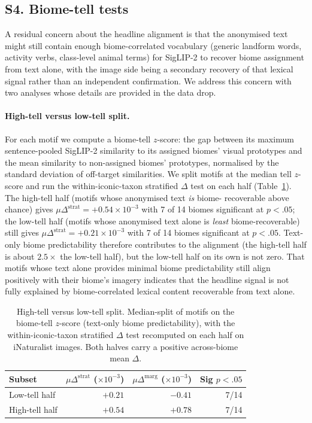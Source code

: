 \documentclass[11pt,a4paper]{article}
\begin{document}
\subsection*{S4. Biome-tell tests}\label{sec:biome-tell}

A residual concern about the headline alignment is that the
anonymised text might still contain enough biome-correlated
vocabulary (generic landform words, activity verbs,
class-level animal terms) for SigLIP-2 to recover biome
assignment from text alone, with the image side being a
secondary recovery of that lexical signal rather than an
independent confirmation. We address this concern with two
analyses whose details are provided in the data drop.

\paragraph*{High-tell versus low-tell split.} For each motif we
compute a biome-tell $z$-score: the gap between its maximum
sentence-pooled SigLIP-2 similarity to its assigned biomes'
visual prototypes and the mean similarity to non-assigned
biomes' prototypes, normalised by the standard deviation of
off-target similarities. We split motifs at the median tell
$z$-score and run the within-iconic-taxon stratified $\Delta$
test on each half (Table~\ref{tab:biome-tell-split}). The
high-tell half (motifs whose anonymised text \emph{is} biome-
recoverable above chance) gives $\mu\Delta^{\text{strat}} =
+0.54\times 10^{-3}$ with 7 of 14 biomes significant at $p<.05$;
the low-tell half (motifs whose anonymised text alone is
\emph{least} biome-recoverable) still gives $\mu\Delta^{
\text{strat}} = +0.21\times 10^{-3}$ with 7 of 14 biomes
significant at $p<.05$. Text-only biome predictability therefore
contributes to the alignment (the high-tell half is about $2.5
\times$ the low-tell half), but the low-tell half on its own is
not zero. That motifs whose text alone provides minimal biome
predictability still align positively with their biome's
imagery indicates that the headline signal is not fully
explained by biome-correlated lexical content recoverable from
text alone.

\begin{table}[h!]
\centering
\caption{High-tell versus low-tell split. Median-split of motifs
on the biome-tell $z$-score (text-only biome predictability),
with the within-iconic-taxon stratified $\Delta$ test recomputed
on each half on iNaturalist images. Both halves carry a positive
across-biome mean $\Delta$.}\label{tab:biome-tell-split}
\begin{tabular}{lrrr}
\hline
Subset & $\mu\Delta^{\text{strat}}$ ($\times 10^{-3}$) & $\mu\Delta^{\text{marg}}$ ($\times 10^{-3}$) & Sig $p<.05$ \\
\hline
Low-tell half  & $+0.21$ & $-0.41$ & 7/14 \\
High-tell half & $+0.54$ & $+0.78$ & 7/14 \\
\hline
\end{tabular}
\end{table}
\end{document}
